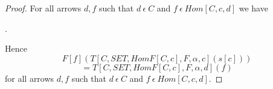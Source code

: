 \documentclass{article}
\newcommand{\mcirc}{\circ_{c}}
\newcommand{\inn}{~\epsilon~}
\begin{document}
\begin{forthel}
\begin{proof}
		For all arrows $d,f$ such that $d\inn C$ and $f\inn Hom[C,c,d]$ we have
		\begin{center}
			.
		\end{center}
	




		Hence
		$$F[f](T[C,SET,HomF[C,c],F,\alpha,c](s[c]))$$
		$$=T[C,SET,HomF[C,c],F,\alpha,d](f)$$
		for all arrows $d,f$ such that $d\inn C$ and $f\inn Hom[C,c,d]$.
		


\end{proof}
\end{forthel}
\end{document}
